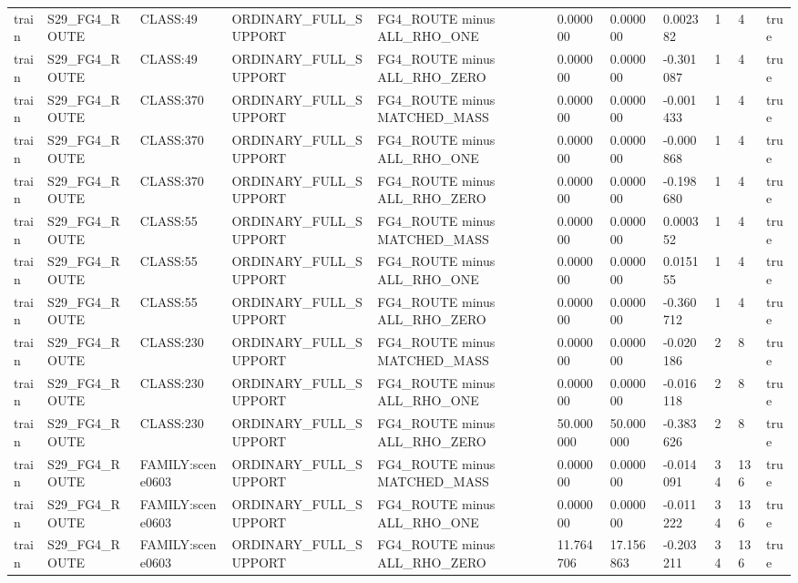 \begin{tabular}{lllllllllll}
train & S29\_FG4\_ROUTE & CLASS:49 & ORDINARY\_FULL\_SUPPORT & FG4\_ROUTE minus ALL\_RHO\_ONE & 0.000000 & 0.000000 & 0.002382 & 1 & 4 & true \\
train & S29\_FG4\_ROUTE & CLASS:49 & ORDINARY\_FULL\_SUPPORT & FG4\_ROUTE minus ALL\_RHO\_ZERO & 0.000000 & 0.000000 & -0.301087 & 1 & 4 & true \\
train & S29\_FG4\_ROUTE & CLASS:370 & ORDINARY\_FULL\_SUPPORT & FG4\_ROUTE minus MATCHED\_MASS & 0.000000 & 0.000000 & -0.001433 & 1 & 4 & true \\
train & S29\_FG4\_ROUTE & CLASS:370 & ORDINARY\_FULL\_SUPPORT & FG4\_ROUTE minus ALL\_RHO\_ONE & 0.000000 & 0.000000 & -0.000868 & 1 & 4 & true \\
train & S29\_FG4\_ROUTE & CLASS:370 & ORDINARY\_FULL\_SUPPORT & FG4\_ROUTE minus ALL\_RHO\_ZERO & 0.000000 & 0.000000 & -0.198680 & 1 & 4 & true \\
train & S29\_FG4\_ROUTE & CLASS:55 & ORDINARY\_FULL\_SUPPORT & FG4\_ROUTE minus MATCHED\_MASS & 0.000000 & 0.000000 & 0.000352 & 1 & 4 & true \\
train & S29\_FG4\_ROUTE & CLASS:55 & ORDINARY\_FULL\_SUPPORT & FG4\_ROUTE minus ALL\_RHO\_ONE & 0.000000 & 0.000000 & 0.015155 & 1 & 4 & true \\
train & S29\_FG4\_ROUTE & CLASS:55 & ORDINARY\_FULL\_SUPPORT & FG4\_ROUTE minus ALL\_RHO\_ZERO & 0.000000 & 0.000000 & -0.360712 & 1 & 4 & true \\
train & S29\_FG4\_ROUTE & CLASS:230 & ORDINARY\_FULL\_SUPPORT & FG4\_ROUTE minus MATCHED\_MASS & 0.000000 & 0.000000 & -0.020186 & 2 & 8 & true \\
train & S29\_FG4\_ROUTE & CLASS:230 & ORDINARY\_FULL\_SUPPORT & FG4\_ROUTE minus ALL\_RHO\_ONE & 0.000000 & 0.000000 & -0.016118 & 2 & 8 & true \\
train & S29\_FG4\_ROUTE & CLASS:230 & ORDINARY\_FULL\_SUPPORT & FG4\_ROUTE minus ALL\_RHO\_ZERO & 50.000000 & 50.000000 & -0.383626 & 2 & 8 & true \\
train & S29\_FG4\_ROUTE & FAMILY:scene0603 & ORDINARY\_FULL\_SUPPORT & FG4\_ROUTE minus MATCHED\_MASS & 0.000000 & 0.000000 & -0.014091 & 34 & 136 & true \\
train & S29\_FG4\_ROUTE & FAMILY:scene0603 & ORDINARY\_FULL\_SUPPORT & FG4\_ROUTE minus ALL\_RHO\_ONE & 0.000000 & 0.000000 & -0.011222 & 34 & 136 & true \\
train & S29\_FG4\_ROUTE & FAMILY:scene0603 & ORDINARY\_FULL\_SUPPORT & FG4\_ROUTE minus ALL\_RHO\_ZERO & 11.764706 & 17.156863 & -0.203211 & 34 & 136 & true \\

\end{tabular}
